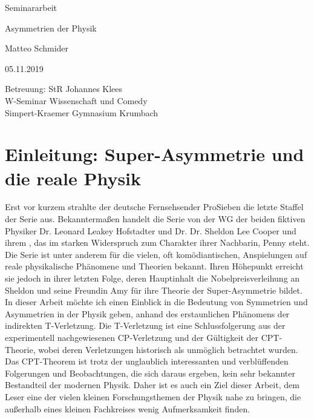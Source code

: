 \documentclass[12pt,a4paper]{scrartcl}
\numberwithin{equation}{section}
\begin{document}
  \pagestyle{empty}

  \begin{titlepage}

    \vspace*{2cm}

 \begin{center} \large

    Seminararbeit
    \vspace*{2cm}

    {\huge Asymmetrien der Physik}
    \vspace*{2.5cm}

    Matteo Schmider
    \vspace*{1.5cm}

    05.11.2019
    \vspace*{4.5cm}


    Betreuung: StR Johannes Klees \\[1cm]
    W-Seminar Wissenschaft und Comedy \\[1cm]
		Simpert-Kraemer Gymnasium Krumbach
  \end{center}
\end{titlepage}



  \tableofcontents

\newpage



  \pagestyle{headings}

  \section{Einleitung: Super-Asymmetrie und die reale Physik}

Erst vor kurzem strahlte der deutsche Fernsehsender ProSieben die letzte Staffel der Serie \grqq{} aus. Bekanntermaßen handelt die Serie von der WG der beiden fiktiven Physiker Dr. Leonard Leakey Hofstadter und Dr. Dr. Sheldon Lee Cooper und ihrem \grqq{}, das im starken Widerspruch zum Charakter ihrer Nachbarin, Penny steht. Die Serie ist unter anderem für die vielen, oft komödiantischen, Anspielungen auf reale physikalische Phänomene und Theorien bekannt. Ihren Höhepunkt erreicht sie jedoch in ihrer letzten Folge, deren Hauptinhalt die Nobelpreisverleihung an Sheldon und seine Freundin Amy für ihre Theorie der Super-Asymmetrie bildet. In dieser Arbeit möchte ich einen Einblick in die Bedeutung von Symmetrien und Asymmetrien in der Physik geben, anhand des erstaunlichen Phänomens der indirekten T-Verletzung. Die T-Verletzung ist eine Schlussfolgerung aus der experimentell nachgewiesenen CP-Verletzung und der Gültigkeit der CPT-Theorie, wobei deren Verletzungen historisch als unmöglich betrachtet wurden. Das CPT-Theorem ist trotz der unglaublich interessanten und verblüffenden Folgerungen und Beobachtungen, die sich daraus ergeben, kein sehr bekannter Bestandteil der modernen Physik. Daher ist es auch ein Ziel dieser Arbeit, dem Leser eine der vielen kleinen Forschungsthemen der Physik nahe zu bringen, die außerhalb eines kleinen Fachkreises wenig Aufmerksamkeit finden.
\end{document}
